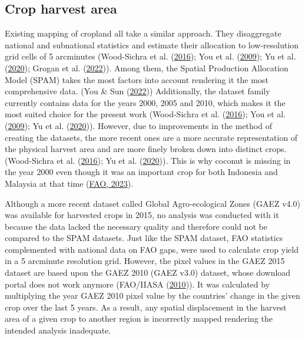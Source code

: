 \documentclass[
  letterpaper,
  DIV=11,
  numbers=noendperiod]{scrreprt}
\begin{document}
\hypertarget{crop-harvest-area}{%
\subsection{Crop harvest area}\label{crop-harvest-area}}

Existing mapping of cropland all take a similar approach. They
disaggregate national and subnational statistics and estimate their
allocation to low-resolution grid cells of 5 arcminutes (Wood-Sichra et
al.
(\protect\hyperlink{ref-wood-sichraSpatialProductionAllocation2016}{2016});
You et al.
(\protect\hyperlink{ref-youGeneratingPlausibleCrop2009}{2009}); Yu et
al. (\protect\hyperlink{ref-yuCultivatedPlanet20102020}{2020}); Grogan
et al. (\protect\hyperlink{ref-groganGlobalGriddedCrop2022}{2022})).
Among them, the Spatial Production Allocation Model (SPAM) takes the
most factors into account rendering it the most comprehensive data. (You
\& Sun (\protect\hyperlink{ref-youMappingGlobalCropping2022}{2022}))
Additionally, the dataset family currently contains data for the years
2000, 2005 and 2010, which makes it the most suited choice for the
present work (Wood-Sichra et al.
(\protect\hyperlink{ref-wood-sichraSpatialProductionAllocation2016}{2016});
You et al.
(\protect\hyperlink{ref-youGeneratingPlausibleCrop2009}{2009}); Yu et
al. (\protect\hyperlink{ref-yuCultivatedPlanet20102020}{2020})).
However, due to improvements in the method of creating the datasets, the
more recent ones are a more accurate representation of the physical
harvest area and are more finely broken down into distinct crops.
(Wood-Sichra et al.
(\protect\hyperlink{ref-wood-sichraSpatialProductionAllocation2016}{2016});
Yu et al. (\protect\hyperlink{ref-yuCultivatedPlanet20102020}{2020})).
This is why coconut is missing in the year 2000 even though it was an
important crop for both Indonesia and Malaysia at that time
(\protect\hyperlink{ref-faoFAOSTATDatabase2023}{FAO, 2023}).

Although a more recent dataset called Global Agro-ecological Zones (GAEZ
v4.0) was available for harvested crops in 2015, no analysis was
conducted with it because the data lacked the necessary quality and
therefore could not be compared to the SPAM datasets. Just like the SPAM
dataset, FAO statistics complemented with national data on FAO gaps,
were used to calculate crop yield in a 5 arcminute resolution grid.
However, the pixel values in the GAEZ 2015 dataset are based upon the
GAEZ 2010 (GAEZ v3.0) dataset, whose download portal does not work
anymore (FAO/IIASA
(\protect\hyperlink{ref-faoux2fiiasaGlobalAgroecologicalZones2010}{2010})).
It was calculated by multiplying the year GAEZ 2010 pixel value by the
countries' change in the given crop over the last 5 years. As a result,
any spatial displacement in the harvest area of a given crop to another
region is incorrectly mapped rendering the intended analysis inadequate.
\end{document}

